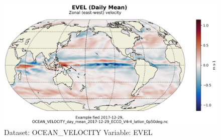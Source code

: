 \begin{figure}[H]
\centering
\includegraphics[scale=0.55]{../images/plots/latlon_plots/Ocean_Velocity/EVEL.png}
\caption{Dataset: OCEAN\_VELOCITY Variable: EVEL}
\label{tab:table-OCEAN_VELOCITY_EVEL-Plot}
\end{figure}
\pagebreak
